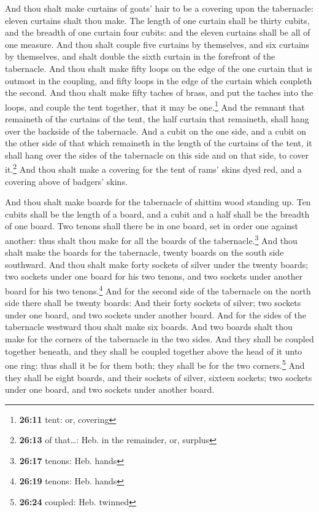  And thou shalt make curtains of goats' hair to be a
covering upon the tabernacle: eleven curtains shalt thou make.
 The length of one curtain shall be thirty cubits, and the
breadth of one curtain four cubits: and the eleven curtains shall be all
of one measure.  And thou shalt couple five curtains by
themselves, and six curtains by themselves, and shalt double the sixth
curtain in the forefront of the tabernacle.  And thou
shalt make fifty loops on the edge of the one curtain that is outmost in
the coupling, and fifty loops in the edge of the curtain which coupleth
the second.  And thou shalt make fifty taches of brass,
and put the taches into the loops, and couple the tent together, that it
may be one.\footnote{\textbf{26:11} tent: or, covering} 
And the remnant that remaineth of the curtains of the tent, the half
curtain that remaineth, shall hang over the backside of the tabernacle.
 And a cubit on the one side, and a cubit on the other
side of that which remaineth in the length of the curtains of the tent,
it shall hang over the sides of the tabernacle on this side and on that
side, to cover it.\footnote{\textbf{26:13} of that\ldots: Heb. in the
  remainder, or, surplus}  And thou shalt make a covering
for the tent of rams' skins dyed red, and a covering above of badgers'
skins.

 And thou shalt make boards for the tabernacle of shittim
wood standing up.  Ten cubits shall be the length of a
board, and a cubit and a half shall be the breadth of one board.
 Two tenons shall there be in one board, set in order one
against another: thus shalt thou make for all the boards of the
tabernacle.\footnote{\textbf{26:17} tenons: Heb. hands} 
And thou shalt make the boards for the tabernacle, twenty boards on the
south side southward.  And thou shalt make forty sockets
of silver under the twenty boards; two sockets under one board for his
two tenons, and two sockets under another board for his two
tenons.\footnote{\textbf{26:19} tenons: Heb. hands}  And
for the second side of the tabernacle on the north side there shall be
twenty boards:  And their forty sockets of silver; two
sockets under one board, and two sockets under another board.
 And for the sides of the tabernacle westward thou shalt
make six boards.  And two boards shalt thou make for the
corners of the tabernacle in the two sides.  And they
shall be coupled together beneath, and they shall be coupled together
above the head of it unto one ring: thus shall it be for them both; they
shall be for the two corners.\footnote{\textbf{26:24} coupled: Heb.
  twinned}  And they shall be eight boards, and their
sockets of silver, sixteen sockets; two sockets under one board, and two
sockets under another board.

